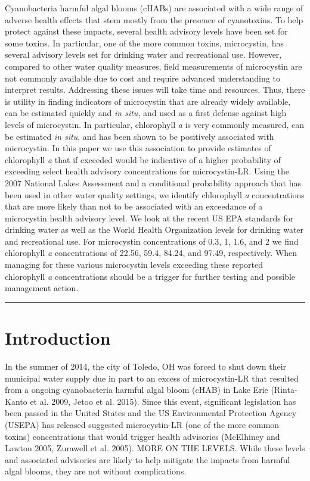 \documentclass[11pt,]{article}
\begin{document}
Cyanobacteria harmful algal blooms (cHABs) are associated with a wide
range of adverse health effects that stem mostly from the presence of
cyanotoxins. To help protect against these impacts, several health
advisory levels have been set for some toxins. In particular, one of the
more common toxins, microcystin, has several advisory levels set for
drinking water and recreational use. However, compared to other water
quality measures, field measurements of microcystin are not commonly
available due to cost and require advanced understanding to interpret
results. Addressing these issues will take time and resources. Thus,
there is utility in finding indicators of microcystin that are already
widely available, can be estimated quickly and \emph{in situ}, and used
as a first defense against high levels of microcystin. In particular,
chlorophyll \emph{a} is very commonly measured, can be estimated
\emph{in situ}, and has been shown to be positively associated with
microcystin. In this paper we use this association to provide estimates
of chlorophyll \emph{a} that if exceeded would be indicative of a higher
probability of exceeding select health advisory concentrations for
microcystin-LR. Using the 2007 National Lakes Assessment and a
conditional probability approach that has been used in other water
quality settings, we identify chlorophyll \emph{a} concentrations that
are more likely than not to be associated with an exceedance of a
microcystin health advisory level. We look at the recent US EPA
standards for drinking water as well as the World Health Organization
levels for drinking water and recreational use. For microcystin
concentrations of 0.3, 1, 1.6, and 2 we find chlorophyll \emph{a}
concentrations of 22.56, 59.4, 84.24, and 97.49, respectively. When
managing for these various microcystin levels exceeding these reported
chlorophyll \emph{a} concentrations should be a trigger for further
testing and possible management action.

\vspace{3mm}

\hrule

\doublespace

\section{Introduction}\label{introduction}

In the summer of 2014, the city of Toledo, OH was forced to shut down
their municipal water supply due in part to an excess of microcystin-LR
that resulted from a ongoing cyanobacteria harmful algal bloom (cHAB) in
Lake Erie (Rinta-Kanto et al. 2009, Jetoo et al. 2015). Since this
event, significant legislation has been passed in the United States and
the US Environmental Protection Agency (USEPA) has released suggested
microcystin-LR (one of the more common toxins) concentrations that would
trigger health advisories (McElhiney and Lawton 2005, Zurawell et al.
2005). MORE ON THE LEVELS. While these levels and associated advisories
are likely to help mitigate the impacts from harmful algal blooms, they
are not without complications.
\end{document}
